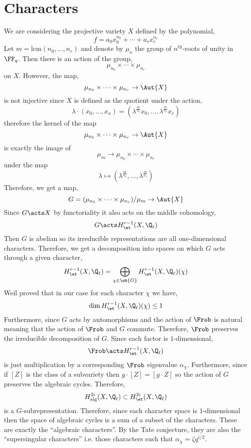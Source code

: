 \documentclass[12pt]{article}
\begin{document}
\section{Characters}

\newcommand{\lcm}{\mathrm{lcm}}

We are considering the projective variety $X$ defined by the polynomial,
\[ f = a_0 x_0^{n_0} + \cdots + a_r x_r^{n_r} \]
Let $m = \lcm(n_0, \dots, n_r)$ and denote by $\mu_n$ the group of $n^{\text{th}}$-roots of unity in $\FF_q$. Then there is an action of the group,
\[ \mu_{n_0} \times \cdots \times \mu_{n_r} \]
on $X$. However, the map,
\[ \mu_{n_0} \times \cdots \times \mu_{n_r} \to \Aut{X} \]
is not injective since $X$ is defined as the quotient under the action,
\[ \lambda \cdot (x_0, \dots, x_n) = (\lambda^{\frac{m}{n_0}} x_0, \dots, \lambda^{\frac{m}{n_r}} x_r) \] 
therefore the kernel of the map 
\[ \mu_{n_0} \times \cdots \times \mu_{n_r} \to \Aut{X} \]
is exactly the image of
\[ \mu_m \to \mu_{n_0} \times \cdots \times \mu_{n_r} \]
under the map 
\[ \lambda \mapsto (\lambda^{\frac{m}{n_0}}, \dots, \lambda^{\frac{m}{n_r}}) \]
Therefore, we get a map,
\[ G = (\mu_{n_0} \times \cdots \times \mu_{n_r})/\mu_m \to \Aut{X} \]
Since $G \acts X$ by functoriality it also acts on the middle cohomology,
\[ G \acts H^{r-1}_{\et}(X, \Q_\ell) \]
Then $G$ is abelian so its irreducible representations are all one-dimensional characters. Therefore, we get a decomposition into spaces on which $G$ acts through a given character,
\[ H^{r-1}_{\et}(X, \Q_\ell) = \bigoplus_{\chi \in \wh{G}} H^{r-1}_{\et}(X, \Q_\ell)(\chi) \]
Weil proved that in our case for each character $\chi$ we have,
\[ \dim H^{r-1}_{\et}(X, \Q_\ell)(\chi) \le 1 \]
Furthermore, since $G$ acts by automorphisms and the action of $\Frob$ is natural meaning that the action of $\Frob$ and $G$ commute. Therefore, $\Frob$ preserves the irreducible decomposition of $G$. Since each factor is $1$-dimensional, 
\[ \Frob \acts H^{r-1}_{\et}(X, \Q_\ell) \]
is just multiplication by a corresponding $\Frob$ eigenvalue $\alpha_{\chi}$. Furthermore, since if $[Z]$ is the class of a subvariety then $g \cdot [Z] = [g \cdot Z]$ so the action of $G$ preserves the algebraic cycles. Therefore,
\[ H_{\text{alg}}^{2i}(X, \Q_\ell) \subset H^{2i}_{\et}(X, \Q_\ell) \]
is a $G$-subrepresentation. Therefore, since each character space is $1$-dimensional then the space of algebraic cycles is a sum of a subset of the characters. These are exactly the ``algebraic characters''. By the Tate conjecture, they are also the ``supersingular characters'' i.e. those characters such that $\alpha_{\chi} = \zeta q^{i/2}$. 
\end{document}
